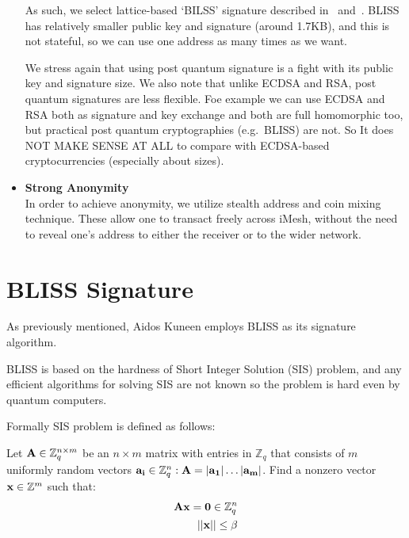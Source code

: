 \documentclass[a4paper,10pt,twocolumn]{article}
\begin{document}
\begin{itemize}
    	
	\vspace{2.5mm}
	
	As such, we select lattice-based `BILSS' signature described in~\cite{bliss} and~\cite{blissb}. BLISS has relatively smaller public key and signature (around 1.7KB),
	and this is not stateful, so we can use one address as many times as we want.
	
	We stress again that using post quantum signature is a fight with its public key and signature size.
	We also note that unlike ECDSA and RSA, post quantum signatures are less flexible.
	Foe example we can use ECDSA and RSA  both as signature and key exchange and both are full homomorphic too, but practical post quantum cryptographies (e.g.\ BLISS) are not.
	So It does NOT MAKE SENSE AT ALL to compare with ECDSA-based cryptocurrencies (especially about sizes).

	\item\textbf{Strong Anonymity}\\ 
	In order to achieve anonymity, we utilize stealth address and coin mixing technique.
	These allow one to transact freely across iMesh, without the need to reveal one's address to either the receiver or to the wider network.
	\end{itemize}
	
	\section{BLISS Signature}
\label{sec:sig}
	
	As previously mentioned, Aidos Kuneen employs BLISS  as its signature algorithm.

BLISS is based on the hardness of Short Integer Solution (SIS) problem, 
and any efficient algorithms for solving SIS are  not known so the problem is hard even by quantum computers.

Formally SIS problem is defined as follows:

Let \( {\bf A} \in \mathbb{Z}^{n \times m}_{q} \) be an \( n \times m \) matrix with entries in \( \mathbb{Z}_{q} \) 
that consists of \( m \) uniformly random vectors  \( {\bf a_{i}} \in \mathbb{Z}^{n}_{q} : {\bf A} = |{\bf a_1}| \dots |{\bf a_m}| \).
Find a nonzero vector \( {\bf x} \in \mathbb{Z}^{m}\) such that: 
\begin{eqnarray}
	{\bf A}{\bf x}={\bf 0}  \in \mathbb{Z}^{n}_{q} \\
	|| {\bf x} || \le \beta 
\end{eqnarray}
\end{document}
